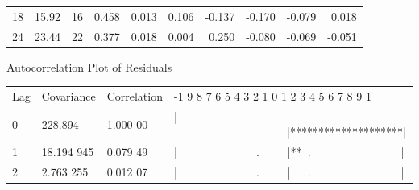 \begin{mvbox}
{{\begin{tabular}{llllrrrrrr}
18 & 15.92 & 16 & 0.458 & 0.013 & 0.106 & -0.137 & -0.170 & -0.079 & 0.018\\
24 & 23.44 & 22 & 0.377 & 0.018 & 0.004 & 0.250 & -0.080 & -0.069 & -0.051\\
\end{tabular}\par}
\vspace{12pt}
Autocorrelation Plot of Residuals\par
\vspace{8pt}
{\centering
\begin{tabular}{llll}
Lag & Covariance & Correlation & -1 9 8 7 6 5 4 3 2 1 0 1 2 3 4 5 6 7 8 9 1\\
0 & 228.894 & 1.000 00 & |\ \ \ \ \ \ \ \ \ \ \ \ \ \ \ \ \ \ \ \ |********************|\\
1 & 18.194 945 & 0.079 49 & |\ \ \ \ \ \ \ \ \ \ \ \ \ \ .\ \ \ \ \ |**\ .\ \ \ \ \ \ \ \ \ \ \ \ \ \ \ \ |\\
2 & 2.763 255 & 0.012 07 & |\ \ \ \ \ \ \ \ \ \ \ \ \ \ .\ \ \ \ \ |\ \ \ .\ \ \ \ \ \ \ \ \ \ \ \ \ \ \ \ |\\
\end{tabular}\par}
\par}
\end{mvbox}
